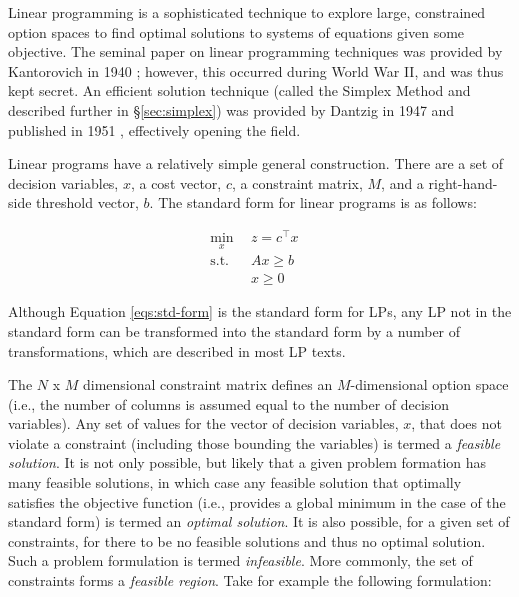 Linear programming is a sophisticated technique to explore large, constrained
option spaces to find optimal solutions to systems of equations given some
objective. The seminal paper on linear programming techniques was provided by
Kantorovich in 1940 \cite{kantorovich_new_1940}; however, this occurred during
World War II, and was thus kept secret. An efficient solution technique (called
the Simplex Method and described further in \S\ref{sec:simplex}) was provided by
Dantzig in 1947 and published in 1951 \cite{dantzig_maximization_1951},
effectively opening the field.

Linear programs have a relatively simple general construction. There are a set
of decision variables, $x$, a cost vector, $c$, a constraint matrix, $M$, and a
right-hand-side threshold vector, $b$. The standard form for linear programs is
as follows:

\begin{subequations}\label{eqs:std-form}
  \begin{align}
    \min_{x} \:\: & 
    z = c^{\top} x
    & \label{eqs:std-form_obj} \\
    \text{s.t.} \:\: &
    A x \geq b 
    & \label{eqs:std-form_sup} \\
    &
    x \geq 0
    &\label{eqs:std-form_x}
  \end{align}
\end{subequations}

Although Equation \ref{eqs:std-form} is the standard form for LPs, any LP not in
the standard form can be transformed into the standard form by a number of
transformations, which are described in most LP texts.

The $N$ x $M$ dimensional constraint matrix defines an $M$-dimensional option
space (i.e., the number of columns is assumed equal to the number of decision
variables). Any set of values for the vector of decision variables, $x$, that
does not violate a constraint (including those bounding the variables) is termed
a \textit{feasible solution}. It is not only possible, but likely that a given
problem formation has many feasible solutions, in which case any feasible
solution that optimally satisfies the objective function (i.e., provides a
global minimum in the case of the standard form) is termed an \textit{optimal
solution}. It is also possible, for a given set of constraints, for there to be
no feasible solutions and thus no optimal solution. Such a problem formulation
is termed \textit{infeasible}. More commonly, the set of constraints forms
a \textit{feasible region}. Take for example the following formulation:


